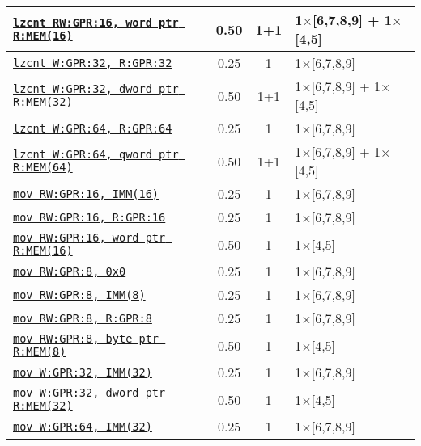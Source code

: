 \documentclass[a4paper,english,fontsize=9]{scrartcl}
\begin{document}
\begin{longtable}{p{}ccL{.25\textwidth}}
  \midrule
  \texttt{\href{https://felixcloutier.com/x86/LZCNT.html}{lzcnt RW:GPR:16, word ptr R:MEM(16)}} & 0.50 & 1+1 & 1\(\times\)[6,7,8,9] + 1\(\times\)[4,5] \\
  \midrule
  \texttt{\href{https://felixcloutier.com/x86/LZCNT.html}{lzcnt W:GPR:32, R:GPR:32}} & 0.25 & 1 & 1\(\times\)[6,7,8,9] \\
  \midrule
  \texttt{\href{https://felixcloutier.com/x86/LZCNT.html}{lzcnt W:GPR:32, dword ptr R:MEM(32)}} & 0.50 & 1+1 & 1\(\times\)[6,7,8,9] + 1\(\times\)[4,5] \\
  \midrule
  \texttt{\href{https://felixcloutier.com/x86/LZCNT.html}{lzcnt W:GPR:64, R:GPR:64}} & 0.25 & 1 & 1\(\times\)[6,7,8,9] \\
  \midrule
  \texttt{\href{https://felixcloutier.com/x86/LZCNT.html}{lzcnt W:GPR:64, qword ptr R:MEM(64)}} & 0.50 & 1+1 & 1\(\times\)[6,7,8,9] + 1\(\times\)[4,5] \\
  \midrule
  \texttt{\href{https://felixcloutier.com/x86/MOV.html}{mov RW:GPR:16, IMM(16)}} & 0.25 & 1 & 1\(\times\)[6,7,8,9] \\
  \midrule
  \texttt{\href{https://felixcloutier.com/x86/MOV.html}{mov RW:GPR:16, R:GPR:16}} & 0.25 & 1 & 1\(\times\)[6,7,8,9] \\
  \midrule
  \texttt{\href{https://felixcloutier.com/x86/MOV.html}{mov RW:GPR:16, word ptr R:MEM(16)}} & 0.50 & 1 & 1\(\times\)[4,5] \\
  \midrule
  \texttt{\href{https://felixcloutier.com/x86/MOV.html}{mov RW:GPR:8, 0x0}} & 0.25 & 1 & 1\(\times\)[6,7,8,9] \\
  \midrule
  \texttt{\href{https://felixcloutier.com/x86/MOV.html}{mov RW:GPR:8, IMM(8)}} & 0.25 & 1 & 1\(\times\)[6,7,8,9] \\
  \midrule
  \texttt{\href{https://felixcloutier.com/x86/MOV.html}{mov RW:GPR:8, R:GPR:8}} & 0.25 & 1 & 1\(\times\)[6,7,8,9] \\
  \midrule
  \texttt{\href{https://felixcloutier.com/x86/MOV.html}{mov RW:GPR:8, byte ptr R:MEM(8)}} & 0.50 & 1 & 1\(\times\)[4,5] \\
  \midrule
  \texttt{\href{https://felixcloutier.com/x86/MOV.html}{mov W:GPR:32, IMM(32)}} & 0.25 & 1 & 1\(\times\)[6,7,8,9] \\
  \midrule
  \texttt{\href{https://felixcloutier.com/x86/MOV.html}{mov W:GPR:32, dword ptr R:MEM(32)}} & 0.50 & 1 & 1\(\times\)[4,5] \\
  \midrule
  \texttt{\href{https://felixcloutier.com/x86/MOV.html}{mov W:GPR:64, IMM(32)}} & 0.25 & 1 & 1\(\times\)[6,7,8,9] \\

\end{longtable}
\end{document}
